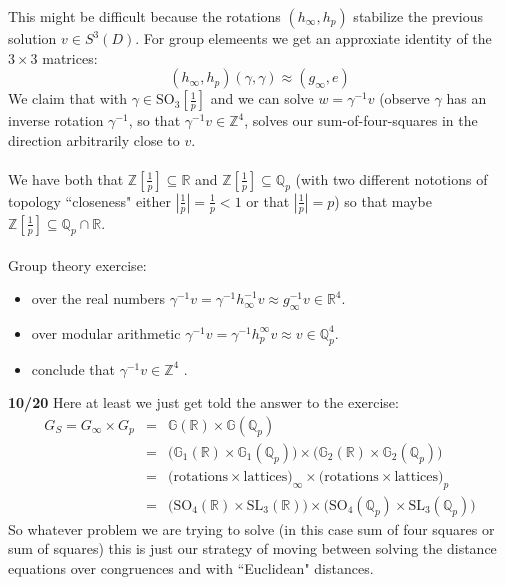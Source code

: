 \documentclass[12pt]{article}
\begin{document}
{This might be difficult because the rotations 
$(h_\infty, h_p)$ stabilize the previous solution $v \in S^3(D)$.  For group elemeents we get an approxiate identity of the $3 \times 3$ matrices:
$$ (h_\infty, h_p) (\gamma, \gamma) \approx (g_\infty, e) $$
We claim that with $\gamma \in \text{SO}_3[\frac{1}{p}]$ and we can solve $w = \gamma^{-1}v $ (observe $\gamma$ has an inverse rotation $\gamma^{-1}$, so that $\gamma^{-1}v \in \mathbb{Z}^4$, solves our sum-of-four-squares in the direction arbitrarily close to $v$. \\ \\
We have both that $\mathbb{Z}[\frac{1}{p}] \subseteq \mathbb{R}$ and $\mathbb{Z}[\frac{1}{p}] \subseteq \mathbb{Q}_p$ (with two different nototions of topology ``closeness" either $|\frac{1}{p}| = \frac{1}{p} < 1$ or that $|\frac{1}{p}| = p$) so that maybe $\mathbb{Z}[\frac{1}{p}] \subseteq \mathbb{Q}_p \cap \mathbb{R} $. \\ \\
Group theory exercise:
\begin{itemize}
\item over the real numbers $\gamma^{-1}v = \gamma^{-1} h_\infty^{-1}v \approx g_\infty^{-1} v \in \mathbb{R}^4$.
\item over modular arithmetic $\gamma^{-1}v = \gamma^{-1} h_p^\infty v \approx v \in \mathbb{Q}_p^4$.
\item conclude that $\gamma^{-1} v \in \mathbb{Z}^4$ .
\end{itemize}
\textbf{10/20} Here at least we just get told the answer to the exercise:
\begin{eqnarray*} G_S = G_\infty \times G_p 
&=& \mathbb{G}(\mathbb{R}) \times \mathbb{G}(\mathbb{Q}_p) \\
&=& \big( \mathbb{G}_1(\mathbb{R}) \times \mathbb{G}_1(\mathbb{Q}_p) \big) \times 
\big( \mathbb{G}_2(\mathbb{R}) \times \mathbb{G}_2(\mathbb{Q}_p) \big) \\ 
&=& \big(\text{rotations} \times \text{lattices}\big)_\infty \times \big(\text{rotations} \times \text{lattices}\big)_p \\  
&=& \big(\text{SO}_4(\mathbb{R}) \times \text{SL}_3(\mathbb{R})\big)
\times 
\big(\text{SO}_4(\mathbb{Q}_p) \times \text{SL}_3(\mathbb{Q}_p)\big)  \end{eqnarray*}
So whatever problem we are trying to solve (in this case sum of four squares or sum of  squares) this is just our strategy of moving between solving the distance equations over congruences and with ``Euclidean" distances.
}
\end{document}
